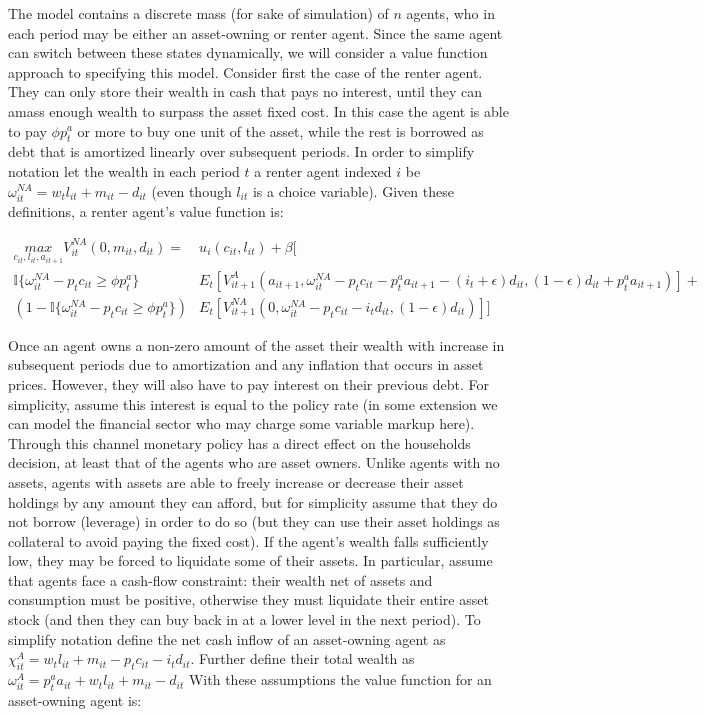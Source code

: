 \documentclass{article}
\begin{document}
The model contains a discrete mass (for sake of simulation) of $n$ agents, who in each period may be either an asset-owning or renter agent. Since the same agent can switch between these states dynamically, we will consider a value function approach to specifying this model. Consider first the case of the renter agent. They can only store their wealth in cash that pays no interest, until they can amass enough wealth to surpass the asset fixed cost. In this case the agent is able to pay $\phi p^a_t$ or more to buy one unit of the asset, while the rest is borrowed as debt that is amortized linearly over subsequent periods. In order to simplify notation let the wealth in each period $t$ a renter agent indexed $i$ be $\omega^{NA}_{it} = w_t l_{it} + m_{it} - d_{it}$ (even though $l_{it}$ is a choice variable). Given these definitions, a renter agent's value function is:

\begin{align}
  \underset{c_{it}, l_{it}, a_{it+1}}{max} V^{NA}_{it}(0, m_{it}, d_{it}) = &u_{i}(c_{it}, l_{it}) + \beta [ \nonumber \\ 
  \mathbb{I}\{\omega^{NA}_{it} - p_t c_{it} \geq \phi p_t^a \} &E_t[V^A_{it+1}(a_{it+1}, \omega^{NA}_{it} - p_t c_{it} - p^a_t a_{it+1} - (i_t + \epsilon) d_{it}, (1 - \epsilon) d_{it} + p^a_t a_{it+1})] + \nonumber \\ 
  \left(1 - \mathbb{I}\{\omega^{NA}_{it} - p_t c_{it} \geq \phi p_t^a \} \right) &E_t[V^{NA}_{it+1}(0, \omega^{NA}_{it} - p_t c_{it} - i_t d_{it}, (1 - \epsilon) d_{it})]]\label{vna}
\end{align}

Once an agent owns a non-zero amount of the asset their wealth with increase in subsequent periods due to amortization and any inflation that occurs in asset prices. However, they will also have to pay interest on their previous debt. For simplicity, assume this interest is equal to the policy rate (in some extension we can model the financial sector who may charge some variable markup here). Through this channel monetary policy has a direct effect on the households decision, at least that of the agents who are asset owners. Unlike agents with no assets, agents with assets are able to freely increase or decrease their asset holdings by any amount they can afford, but for simplicity assume that they do not borrow (leverage) in order to do so (but they can use their asset holdings as collateral to avoid paying the fixed cost). If the agent's wealth falls sufficiently low, they may be forced to liquidate some of their assets. In particular, assume that agents face a cash-flow constraint: their wealth net of assets and consumption must be positive, otherwise they must liquidate their entire asset stock (and then they can buy back in at a lower level in the next period). To simplify notation define the net cash inflow of an asset-owning agent as $\chi^A_{it} = w_t l_{it} + m_{it} - p_t c_{it} - i_t d_{it}$. Further define their total wealth as $\omega^A_{it} = p^a_t a_{it} + w_t l_{it} + m_{it} - d_{it}$ With these assumptions the value function for an asset-owning agent is:
\end{document}
